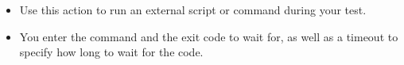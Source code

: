 
\begin{itemize}
\item Use this action to run an external script or command during your test. 
\item You enter the command and the exit code to wait for, as well as a timeout to specify how long to wait for the code. 
\end{itemize}
